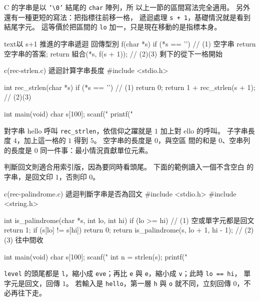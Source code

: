 C 的字串是以 \texttt{'\textbackslash 0'} 結尾的 \texttt{char} 陣列，所
以上一節的區間寫法完全適用。 另外還有一種更短的寫法：把指標往前移一格，
遞迴處理 \texttt{s + 1}，基礎情況就是看到結尾字元。 這等價於把區間的
\texttt{lo} 加一，只是現在移動的是指標本身。

\begin{code}{text}{以 s+1 推進的字串遞迴}
回傳型別 f(char *s) {
    if (*s == '\0') {          // (1) 空字串
        return 空字串的答案;
    }
    return 組合(*s, f(s + 1)); // (2)(3) 剩下的從下一格開始
}
\end{code}

\begin{example}{c}{(rec-strlen.c) 遞迴計算字串長度}
#include <stdio.h>

int rec_strlen(char *s) {
    if (*s == '\0') {          // (1)
        return 0;
    }
    return 1 + rec_strlen(s + 1);  // (2)(3)
}

int main(void) {
    char s[100];
    scanf("%
    printf("%
}
\end{example}


對字串 hello 呼叫 \texttt{rec\_strlen}，依信仰之躍就是 $1$ 加上對
ello 的呼叫。
子字串長度 $4$，加上這一格的 $1$ 得到 $5$。 空字串的長度是 $0$，與空區
間的和是 $0$、空串列的長度是 $0$ 同一件事：最小情況貢獻單位元素。

判斷回文則適合用索引版，因為要同時看頭尾。 下面的範例讀入一個不含空白
的字串，是回文印 $1$，否則印 $0$。

\begin{example}{c}{(rec-palindrome.c) 遞迴判斷字串是否為回文}
#include <stdio.h>
#include <string.h>

int is_palindrome(char *s, int lo, int hi) {
    if (lo >= hi) {                // (1) 空或單字元都是回文
        return 1;
    }
    if (s[lo] != s[hi]) {
        return 0;
    }
    return is_palindrome(s, lo + 1, hi - 1);  // (2)(3) 往中間收
}

int main(void) {
    char s[100];
    scanf("%
    int n = strlen(s);
    printf("%
}
\end{example}


\texttt{level} 的頭尾都是 \texttt{l}，縮小成 \texttt{eve}；再比
\texttt{e} 與 \texttt{e}，縮小成 \texttt{v}；此時 \texttt{lo == hi}，
單字元是回文，回傳 $1$。 若輸入是 \texttt{hello}，第一層 \texttt{h} 與
\texttt{o} 就不同，立刻回傳 $0$，不必再往下走。

